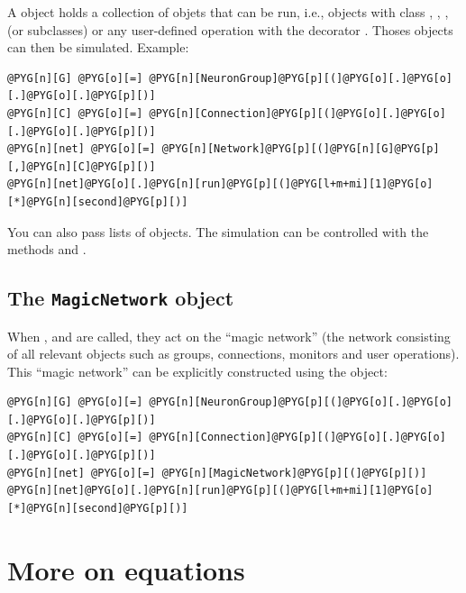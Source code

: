 \documentclass[letterpaper,10pt,english]{manual}
\begin{document}
A \hyperlink{brian.Network}{} object holds a collection of objets that can be run, i.e., objects with class \hyperlink{brian.NeuronGroup}{},
\hyperlink{brian.Connection}{}, \hyperlink{brian.SpikeMonitor}{}, \hyperlink{brian.StateMonitor}{} (or subclasses) or any user-defined operation with the decorator
\hyperlink{brian.network_operation}{}. Thoses objects can then be simulated. Example:

\begin{Verbatim}[commandchars=@\[\]]
@PYG[n][G] @PYG[o][=] @PYG[n][NeuronGroup]@PYG[p][(]@PYG[o][.]@PYG[o][.]@PYG[o][.]@PYG[p][)]
@PYG[n][C] @PYG[o][=] @PYG[n][Connection]@PYG[p][(]@PYG[o][.]@PYG[o][.]@PYG[o][.]@PYG[p][)]
@PYG[n][net] @PYG[o][=] @PYG[n][Network]@PYG[p][(]@PYG[n][G]@PYG[p][,]@PYG[n][C]@PYG[p][)]
@PYG[n][net]@PYG[o][.]@PYG[n][run]@PYG[p][(]@PYG[l+m+mi][1]@PYG[o][*]@PYG[n][second]@PYG[p][)]
\end{Verbatim}

You can also pass lists of objects. The simulation can be controlled with the methods
 and .


\subsection{The \texttt{MagicNetwork} object}

When \hyperlink{brian.run}{}, \hyperlink{brian.reinit}{} and \hyperlink{brian.stop}{} are called, they act on the ``magic network'' (the network
consisting of all relevant objects such as groups, connections, monitors and user operations). This ``magic
network'' can be explicitly constructed using the \hyperlink{brian.MagicNetwork}{} object:

\begin{Verbatim}[commandchars=@\[\]]
@PYG[n][G] @PYG[o][=] @PYG[n][NeuronGroup]@PYG[p][(]@PYG[o][.]@PYG[o][.]@PYG[o][.]@PYG[p][)]
@PYG[n][C] @PYG[o][=] @PYG[n][Connection]@PYG[p][(]@PYG[o][.]@PYG[o][.]@PYG[o][.]@PYG[p][)]
@PYG[n][net] @PYG[o][=] @PYG[n][MagicNetwork]@PYG[p][(]@PYG[p][)]
@PYG[n][net]@PYG[o][.]@PYG[n][run]@PYG[p][(]@PYG[l+m+mi][1]@PYG[o][*]@PYG[n][second]@PYG[p][)]
\end{Verbatim}

\resetcurrentobjects
\hypertarget{--doc-equations}{}

\hypertarget{moreonequations}{}\section{More on equations}
\end{document}

